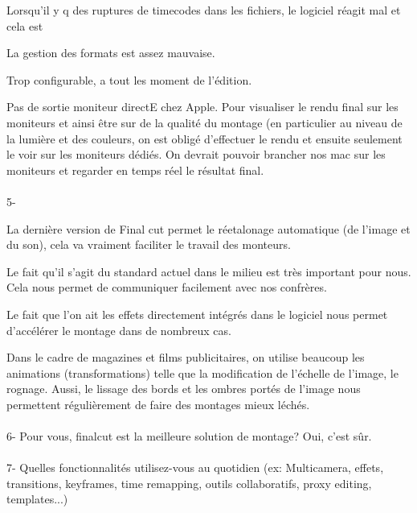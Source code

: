 Lorsqu'il y q des ruptures de timecodes dans les fichiers, le logiciel réagit mal
et cela est %

La gestion des formats est assez mauvaise.

Trop configurable, a tout les moment de l'édition.%

Pas de sortie moniteur directE chez Apple. Pour visualiser le rendu final sur les
moniteurs et ainsi être sur de la qualité du montage (en particulier au niveau de
la lumière et des couleurs, on est obligé d'effectuer le rendu et ensuite
seulement le voir sur les moniteurs dédiés. On devrait pouvoir brancher nos mac
sur les moniteurs et regarder en temps réel le résultat final.

\paragraph{}
5- %

La dernière version de Final cut permet le réetalonage automatique (de l'image
et du son), cela va vraiment faciliter le travail des monteurs.

Le fait qu'il s'agit du standard actuel dans le milieu est très important pour
nous. Cela nous permet de communiquer facilement avec nos confrères.

Le fait que l'on ait les effets directement intégrés dans le logiciel nous
permet d'accélérer le montage dans de nombreux cas.

Dans le cadre de magazines et films publicitaires, on utilise beaucoup les
animations (transformations) telle que la modification de l'échelle de l'image,
le rognage. Aussi, le lissage des bords et les ombres portés de l'image nous
permettent régulièrement de faire des montages mieux léchés.


\paragraph{}
6- Pour vous, finalcut est la meilleure solution de montage?
Oui, c'est sûr.

\paragraph{}
7-  Quelles fonctionnalités utilisez-vous au quotidien (ex: Multicamera, effets,
transitions, keyframes, time remapping, outils collaboratifs, proxy
editing, templates...)

